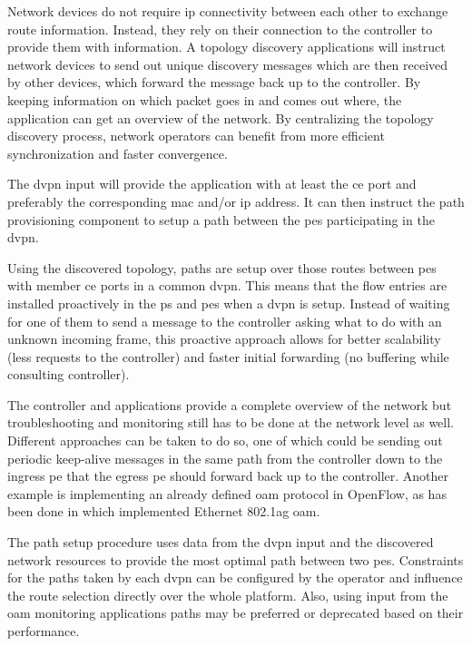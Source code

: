 \begin{description}[leftmargin=!,labelwidth=\widthof{\bfseries Topology Discovery}]
	\item[Topology Discovery] Network devices do not require \ac{ip} connectivity between each other to exchange route information. Instead, they rely on their connection to the controller to provide them with information. A topology discovery applications will instruct network devices to send out unique discovery messages which are then received by other devices, which forward the message back up to the controller. By keeping information on which packet goes in and comes out where, the application can get an overview of the network. By centralizing the topology discovery process, network operators can benefit from more efficient synchronization and faster convergence.
	
	\item[\ac{dvpn} Provisioning] The \ac{dvpn} input will provide the application with at least the \ac{ce} port and preferably the corresponding \ac{mac} and/or \ac{ip} address. It can then instruct the path provisioning component to setup a path between the \acp{pe} participating in the \ac{dvpn}. 
	
	\item[Path Provisioning] Using the discovered topology, paths are setup over those routes between \acp{pe} with member \ac{ce} ports in a common \ac{dvpn}. This means that the flow entries are installed proactively in the \acp{p} and \acp{pe} when a \ac{dvpn} is setup. Instead of waiting for one of them to send a message to the controller asking what to do with an unknown incoming frame, this proactive approach allows for better scalability (less requests to the controller) and faster initial forwarding (no buffering while consulting controller).

	\item[\acs{oam}] The controller and applications provide a complete overview of the network but troubleshooting and monitoring still has to be done at the network level as well. Different approaches can be taken to do so, one of which could be sending out periodic keep-alive messages in the same path from the controller down to the ingress \ac{pe} that the egress \ac{pe} should forward back up to the controller. Another example is implementing an already defined \ac{oam} protocol in OpenFlow, as has been done in \cite{of-oam} which implemented Ethernet 802.1ag \ac{oam}.
	
		\item[Traffic Engineering] The path setup procedure uses data from the \ac{dvpn} input and the discovered network resources to provide the most optimal path between two \acp{pe}. Constraints for the paths taken by each \ac{dvpn} can be configured by the operator and influence the route selection directly over the whole platform. Also, using input from the \ac{oam} monitoring applications paths may be preferred or deprecated based on their performance.
	

\end{description}
